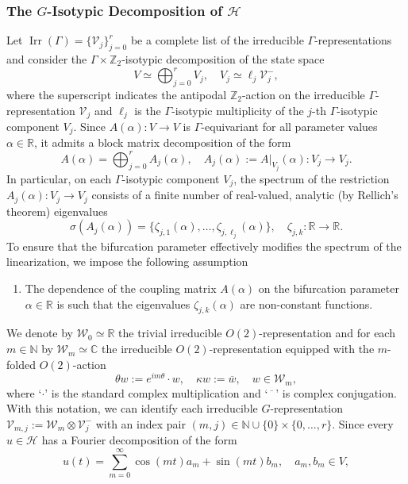 \documentclass[twoside]{article}%
\def\bc{{\mathbb{C}}}
\def\bn{{\mathbb{N}}}
\def\bz{{\mathbb{Z}}}
\def\br{\mathbb R}
\begin{document}
\subsubsection{The $G$-Isotypic Decomposition of $\mathscr H$}\label{sec:G_isotypic_decomp}
Let $\operatorname{Irr}(\Gamma) = \{\mathcal V_j\}_{j=0}^r$ be a complete list of the irreducible $\Gamma$-representations and consider the $\Gamma \times \bz_2$-isotypic decomposition of the state space
\[
V \simeq \bigoplus_{j=0}^r V_j, \quad V_j \simeq \ell_j \mathcal V_j^-,
\]
where the superscript indicates the antipodal $\bz_2$-action on the irreducible $\Gamma$-representation $\mathcal V_j$ and $\ell_j$ is the $\Gamma$-isotypic multiplicity of the $j$-th $\Gamma$-isotypic component $V_j$. Since $A(\alpha) : V \to V$ is $\Gamma$-equivariant for all parameter values $\alpha \in \br$, it admits a block matrix decomposition of the form
\[
A(\alpha) = \bigoplus_{j=0}^r A_j(\alpha), \quad A_j(\alpha) := A|_{V_j}(\alpha) : V_j \to V_j.
\]
In particular, on each $\Gamma$-isotypic component $V_j$, the spectrum of the restriction $A_j(\alpha): V_j \to V_j$ consists of a finite number of real-valued, analytic (by Rellich's theorem) eigenvalues
\[
\sigma(A_j(\alpha)) = \{ \zeta_{j,1}(\alpha), \ldots, \zeta_{j,\ell_j}(\alpha) \}, \quad \zeta_{j,k} : \br \to \br.
\]
To ensure that the bifurcation parameter effectively modifies the spectrum of the linearization, we impose the following assumption
\begin{enumerate}[label=$(A_{\arabic*})$, start=0]
    \item\label{a0} The dependence of the coupling matrix $A(\alpha)$ on the bifurcation parameter $\alpha \in \br$ is such that the eigenvalues $\zeta_{j,k}(\alpha)$ are non-constant functions.
\end{enumerate}
We denote by $\mathcal W_0 \simeq \br$ the trivial irreducible $O(2)$-representation and for each $m \in \bn$ by $\mathcal W_m \simeq \bc$ the irreducible $O(2)$-representation equipped with the $m$-folded $O(2)$-action
\[
\theta w := e^{im\theta} \cdot w, \quad \kappa w := \overline{w}, \quad w \in \mathcal W_m,
\]
where `$\cdot$' is the standard complex multiplication and `$\overline{\phantom{w}}$' is complex conjugation. With this notation, we can identify each irreducible $G$-representation $\mathcal V_{m,j} := \mathcal W_m \otimes \mathcal V_{j}^-$ with an index pair $(m,j) \in \bn \cup \{0\} \times \{0,\ldots,r\}$. Since every $u \in \mathscr H$ has a Fourier decomposition of the form
\[
u(t) = \sum_{m=0}^\infty \cos(mt)a_m + \sin(mt)b_m, \quad a_m,b_m \in V,
\]
\end{document}
